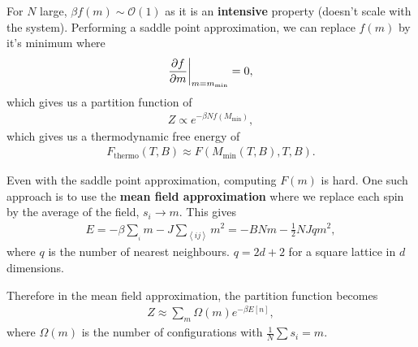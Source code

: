 For $N$ large, $\beta f\left( m \right) \sim  \mathcal{O}\left( 1 \right) $ as it is an \textbf{intensive} property (doesn't scale with the system). Performing a saddle point approximation, we can replace $f\left( m \right) $ by it's minimum where
\begin{align}
    \pdv{f}{m} \bigg|_{m=m_{\text{min}}} = 0
,\end{align}
which gives us a partition function of
\begin{align}
    Z \propto e^{-\beta N f\left( M_{\text{min}} \right) }
,\end{align}
which gives us a thermodynamic free energy of
\begin{align}
    F_{\text{thermo}}\left( T,B \right) \approx F\left( M_{\text{min}}\left( T,B \right) , T,B \right) 
.\end{align}

Even with the saddle point approximation, computing $F\left( m \right) $ is hard. One such approach is to use the \textbf{mean field approximation} where we replace each spin by the average of the field, $s_{i} \to m$. This gives
\begin{align}
    E = - \beta \sum_{_{i}}^{} m - J \sum_{\left<ij \right>}^{} m^2 = - B N m - \frac{1}{2} N J q m^2
,\end{align}
where $q$ is the number of nearest neighbours. $q = 2d+2$ for a square lattice in $d$ dimensions. 

Therefore in the mean field approximation, the partition function becomes
\begin{align}
    Z \approx \sum_{m}^{} \Omega \left( m \right) e^{-\beta E\left[ n \right] } 
,\end{align}
where $\Omega\left( m \right) $ is the number of configurations with $\frac{1}{N} \sum s_{i} = m$.
